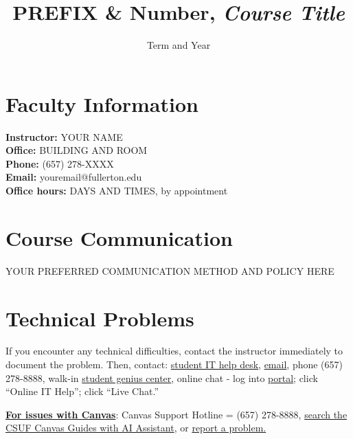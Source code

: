 \documentclass[12pt]{article}
\title{PREFIX \& Number, \textit{Course Title}}
\author{}  %
\date{Term and Year}
\begin{document}

\maketitle

\section*{Faculty Information}
\noindent \textbf{Instructor:} YOUR NAME \\
\noindent \textbf{Office:} BUILDING AND ROOM \\
\noindent \textbf{Phone:} (657) 278-XXXX \\
\noindent \textbf{Email:} youremail@fullerton.edu \\
\noindent \textbf{Office hours:} DAYS AND TIMES, by appointment

\section*{Course Communication}
YOUR PREFERRED COMMUNICATION METHOD AND POLICY HERE

\section*{Technical Problems}
If you encounter any technical difficulties, contact the instructor immediately to document the problem. Then, contact: \href{http://www.fullerton.edu/it/students/helpdesk/index.php}{student IT help desk}, \href{mailto:StudentITHelpDesk@fullerton.edu}{email}, phone (657) 278-8888, walk-in \href{http://www.fullerton.edu/it/students/sgc/index.php}{student genius center}, online chat - log into \href{http://my.fullerton.edu}{portal}; click ``Online IT Help''; click ``Live Chat.''

\vspace{0.5em}
\noindent \textbf{\underline{For issues with Canvas}}: Canvas Support Hotline = (657) 278-8888, \href{https://canvashelp.fullerton.edu/}{search the CSUF Canvas Guides with AI Assistant}, or \href{https://titans.service-now.com/sp?id=sc_cat_item&sys_id=f88efe80ebea6a10fb7cfcffcad0cdc6&subject=Canvas}{report a problem.}
\end{document}
